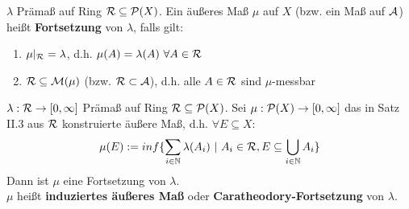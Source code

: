 \documentclass[11pt,a4paper,fleqn,openany]{report}
\begin{document}
    \begin{definition}
      $\lambda$ Prämaß auf Ring $\mathcal{R} \subseteq \mathcal{P}(X)$. Ein äußeres Maß $\mu$ auf $X$ (bzw. ein Maß auf $\mathcal{A}$) heißt \textbf{Fortsetzung} von $\lambda$, falls gilt:
      \begin{enumerate}[label=\roman*)]
        \item $\mu|_{\mathcal{R}} = \lambda$, d.h. $\mu(A) = \lambda(A) \ \forall A \in \mathcal{R}$
        \item $\mathcal{R} \subseteq \mathcal{M}(\mu)$ (bzw. $\mathcal{R} \subset \mathcal{A}$), d.h. alle $A \in \mathcal{R}$ sind $\mu$-messbar
      \end{enumerate}
    \end{definition}

    \begin{theorem}
      $\lambda: \mathcal{R} \to [0, \infty]$ Prämaß auf Ring $\mathcal{R} \subseteq \mathcal{P}(X)$. Sei $\mu: \mathcal{P}(X) \to [0, \infty]$ das in Satz II.3 aus $\mathcal{R}$ konstruierte äußere Maß, d.h. $\forall E \subseteq X:$
      \begin{align*}
        \mu(E) := inf\{\sum\limits_{i \in \mathbb{N}} \lambda(A_i) \ | \ A_i \in \script{R}, E \subseteq \bigcup\limits_{i \in \mathbb{N}} A_i\}
      \end{align*}
      Dann ist $\mu$ eine Fortsetzung von $\lambda$.\\
      $\mu$ heißt \textbf{induziertes äußeres Maß} oder \textbf{Caratheodory-Fortsetzung} von $\lambda$.
    \end{theorem}
\end{document}

